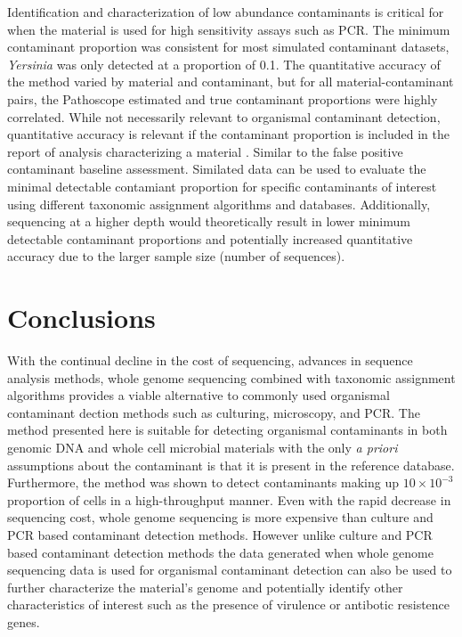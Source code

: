 \documentclass[fleqn,10pt,lineno]{wlpeerj}\usepackage[]{graphicx}\usepackage[]{color}
\begin{document}
Identification and characterization of low abundance contaminants is critical for when the material is used for high sensitivity assays such as PCR. 
The minimum contaminant proportion was consistent for most simulated contaminant datasets, \textit{Yersinia} was only detected at a proportion of 0.1. 
The quantitative accuracy of the method varied by material and contaminant, but for all material-contaminant pairs, the Pathoscope estimated and true contaminant proportions were highly correlated. 
While not necessarily relevant to organismal contaminant detection, quantitative accuracy is relevant if the contaminant proportion is included in the report of analysis characterizing a material \citep{olson2016pepr}.  
Similar to the false positive contaminant baseline assessment. 
Similated data can be used to evaluate the minimal detectable contamiant proportion for specific contaminants of interest using different taxonomic assignment algorithms and databases. 
Additionally, sequencing at a higher depth would theoretically result in lower minimum detectable contaminant proportions and potentially increased quantitative accuracy due to the larger sample size (number of sequences).

\section*{Conclusions}
With the continual decline in the cost of sequencing, advances in sequence analysis methods, whole genome sequencing combined with taxonomic assignment algorithms provides a viable alternative to commonly used organismal contaminant dection methods such as culturing, microscopy, and PCR. 
The method presented here is suitable for detecting organismal contaminants in both genomic DNA and whole cell microbial materials with the only \textit{a priori} assumptions about the contaminant is that it is present in the reference database. 
Furthermore, the method was shown to detect contaminants making up $10 \times 10^{-3}$ proportion of cells in a high-throughput manner. 
Even with the rapid decrease in sequencing cost, whole genome sequencing is more expensive than culture and PCR based contaminant detection methods. However unlike culture and PCR based contaminant detection methods the data generated when whole genome sequencing data is used for organismal contaminant detection can also be used to further characterize the material's genome and potentially identify other characteristics of interest such as the presence of virulence or antibotic resistence genes. 
\end{document}
